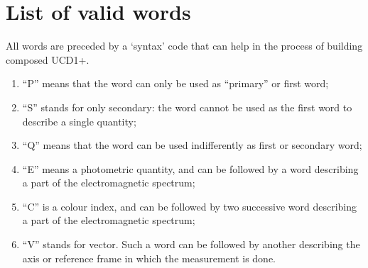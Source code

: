 \documentclass[11pt,a4paper]{ivoa}
\begin{document}
\section{List of valid words}
\label{sec:list}

All words are preceded by a `syntax' code that can help in the process of building composed UCD1+.
\begin{enumerate}
\item ``P'' means that the word can only be used as ``primary'' or first word;
\item ``S'' stands for only secondary: the word cannot be used as the first word to describe a 
single quantity;
\item ``Q'' means that the word can be used indifferently as first or secondary word;
\item ``E'' means a photometric quantity, and can be followed by a word describing a part of 
the electromagnetic spectrum;
\item ``C'' is a colour index, and can be followed by two successive word describing a part of 
the electromagnetic spectrum;
\item ``V'' stands for vector. Such a word can be followed by another describing the axis or 
reference frame in which the measurement is done.
\end{enumerate}
\end{document}

